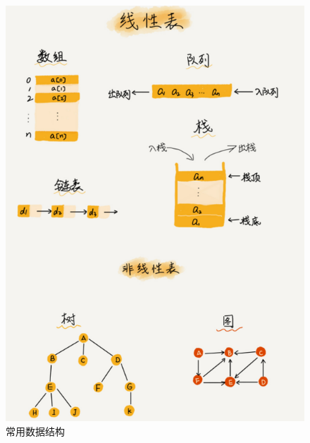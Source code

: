 \begin{figure}[H]
	\centering
	\includegraphics[]{img/C1/1-4/1.png}
	\caption{常用数据结构}
\end{figure}

\newpage